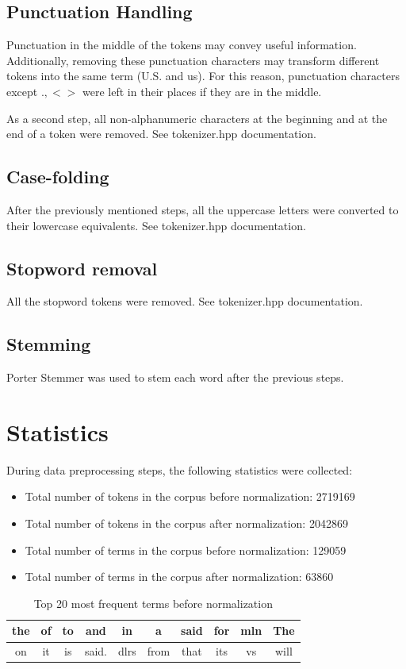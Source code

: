 \documentclass{article}
\begin{document}
\subsection{Punctuation Handling}
Punctuation in the middle of the tokens may convey useful information.
Additionally, removing these punctuation characters may transform different
tokens into the same term (U.S. and us). For this reason, punctuation characters
except $. , < >$ were left in their places if they are in the middle.

As a second step, all non-alphanumeric characters at the beginning and at the
end of a token were removed. See tokenizer.hpp documentation.

\subsection{Case-folding}
After the previously mentioned steps, all the uppercase letters were converted
to their lowercase equivalents. See tokenizer.hpp documentation.

\subsection{Stopword removal}
All the stopword tokens were removed. See tokenizer.hpp documentation.

\subsection{Stemming}
Porter Stemmer was used to stem each word after the previous steps.

\section{Statistics}
During data preprocessing steps, the following statistics were collected:

\begin{itemize}
	\item Total number of tokens in the corpus before normalization: 2719169
	\item Total number of tokens in the corpus after normalization: 2042869
	\item Total number of terms in the corpus before normalization: 129059
	\item Total number of terms in the corpus after normalization: 63860
\end{itemize}

\begin{table}[ht]
	\caption{Top 20 most frequent terms before normalization}
	\centering
	\begin{tabular}{|c|c|c|c|c|c|c|c|c|c|}
		\hline
		the & of & to & and & in & a & said & for & mln & The \\
		\hline
		on & it & is & said. & dlrs & from & that & its & vs & will \\
		\hline
	\end{tabular}
\end{table}
\end{document}
